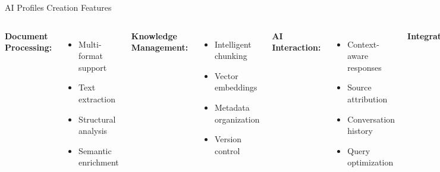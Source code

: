 \documentclass[aspectratio=169]{beamer}
\begin{document}
\begin{frame}{AI Profiles Creation Features}
    \begin{columns}
        \textbf{Document Processing:}
        \begin{itemize}
            \item Multi-format support
            \item Text extraction
            \item Structural analysis
            \item Semantic enrichment
        \end{itemize}
        \textbf{Knowledge Management:}
        \begin{itemize}
            \item Intelligent chunking
            \item Vector embeddings
            \item Metadata organization
            \item Version control
        \end{itemize}
        \textbf{AI Interaction:}
        \begin{itemize}
            \item Context-aware responses
            \item Source attribution
            \item Conversation history
            \item Query optimization
        \end{itemize}
        \textbf{Integration:}
        \begin{itemize}
            \item API access
            \item Course embedding
            \item Permission management
            \item Usage analytics
        \end{itemize}
    \end{columns}
\end{frame}
\end{document}
